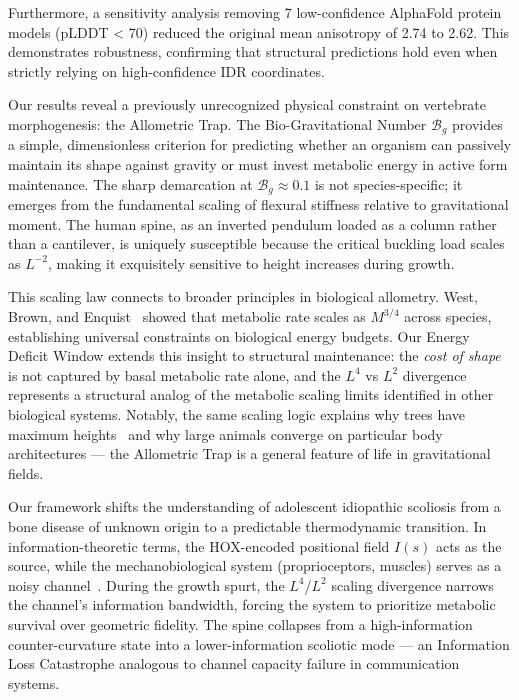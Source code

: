 \documentclass[11pt]{article}
\begin{document}
Furthermore, a sensitivity analysis removing 7 low-confidence AlphaFold protein models (pLDDT < 70) reduced the original mean anisotropy of 2.74 to 2.62. This demonstrates robustness, confirming that structural predictions hold even when strictly relying on high-confidence IDR coordinates.

Our results reveal a previously unrecognized physical constraint on vertebrate morphogenesis: the Allometric Trap. The Bio-Gravitational Number $\mathcal{B}_g$ provides a simple, dimensionless criterion for predicting whether an organism can passively maintain its shape against gravity or must invest metabolic energy in active form maintenance. The sharp demarcation at $\mathcal{B}_g \approx 0.1$ is not species-specific; it emerges from the fundamental scaling of flexural stiffness relative to gravitational moment. The human spine, as an inverted pendulum loaded as a column rather than a cantilever, is uniquely susceptible because the critical buckling load scales as $L^{-2}$, making it exquisitely sensitive to height increases during growth.

This scaling law connects to broader principles in biological allometry. West, Brown, and Enquist~\cite{west1997general} showed that metabolic rate scales as $M^{3/4}$ across species, establishing universal constraints on biological energy budgets. Our Energy Deficit Window extends this insight to structural maintenance: the \emph{cost of shape} is not captured by basal metabolic rate alone, and the $L^4$ vs $L^2$ divergence represents a structural analog of the metabolic scaling limits identified in other biological systems. Notably, the same scaling logic explains why trees have maximum heights~\cite{niklas1994plant} and why large animals converge on particular body architectures --- the Allometric Trap is a general feature of life in gravitational fields.



Our framework shifts the understanding of adolescent idiopathic scoliosis from a bone disease of unknown origin to a predictable thermodynamic transition. In information-theoretic terms, the HOX-encoded positional field $I(s)$ acts as the source, while the mechanobiological system (proprioceptors, muscles) serves as a noisy channel~\cite{cover2006elements}. During the growth spurt, the $L^4$/$L^2$ scaling divergence narrows the channel's information bandwidth, forcing the system to prioritize metabolic survival over geometric fidelity. The spine collapses from a high-information counter-curvature state into a lower-information scoliotic mode --- an Information Loss Catastrophe analogous to channel capacity failure in communication systems.
\end{document}
